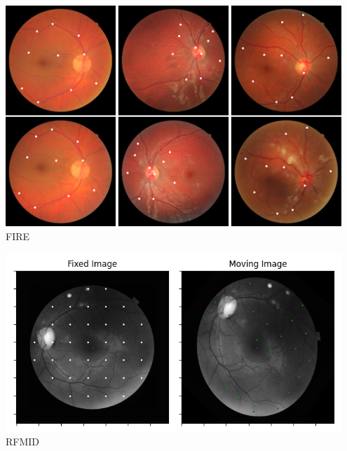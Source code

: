 \documentclass[xcolor=dvipsnames]{beamer}
\begin{document}
\begin{frame}
    \begin{center}
        \begin{minipage}{0.35\textwidth}
            \centering
            \includegraphics[width=0.95\textwidth]{../imaxes/fire-ej.png}\\
            \small FIRE
        \end{minipage}
        \hspace{0.1\textwidth}
        \begin{minipage}{0.4\textwidth}
            \centering
            \includegraphics[width=0.95\textwidth]{../imaxes/rfmid_ej.png}\\
            \small RFMID
        \end{minipage}
        

\end{center}
\end{frame}
\end{document}
